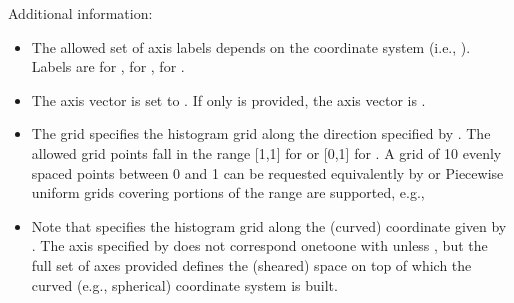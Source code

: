 \documentclass[letterpaper,10pt,english]{sphinxmanual}
\begin{document}
Additional information:
\begin{itemize}
\item {} 
 The allowed set of axis labels depends on the coordinate
system (i.e., ). Labels are  for
,  for ,
 for .

\item {} 
 The axis vector is set to . If
only  is provided, the axis vector is .

\item {} 
 The grid specifies the histogram grid along the direction
specified by . The allowed grid points fall in the range
{[}\sphinxhyphen{}1,1{]} for  or {[}0,1{]} for . A grid of 10
evenly spaced points between 0 and 1 can be requested equivalently by
 or  Piecewise uniform grids
covering portions of the range are supported, e.g.,

\item {} 
Note that  specifies the histogram grid along the (curved)
coordinate given by . The axis specified by 
does not correspond one\sphinxhyphen{}to\sphinxhyphen{}one with  unless ,
but the full set of axes provided defines the (sheared) space on top
of which the curved (e.g., spherical) coordinate system is built.

\end{itemize}
\end{document}
